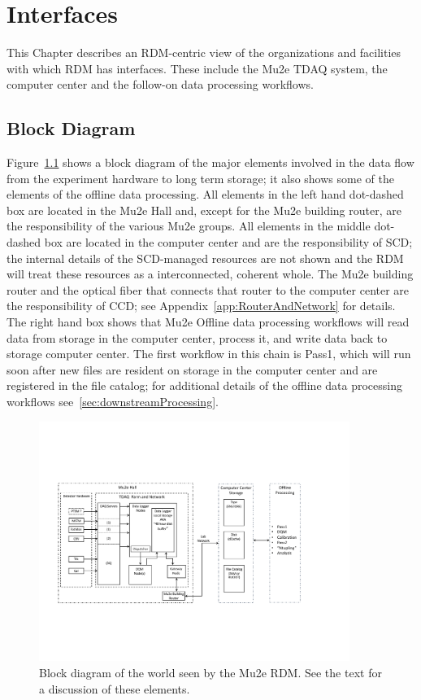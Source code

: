 \chapter{Interfaces}
\label{ch:SelectedDetails}
This Chapter describes an RDM-centric view of the organizations and facilities
with which RDM has interfaces.  These include the Mu2e TDAQ system,
the computer center and the follow-on data processing workflows.

\section{Block Diagram}
\label{sec:BlockDiagram}

Figure~\ref{fig:blockdiagram} shows a block diagram of the major elements involved
in the data flow from the experiment hardware to long term storage; it also shows
some of the elements of the offline data processing.
All elements in the left hand dot-dashed box are located in the Mu2e Hall
and, except for the Mu2e building router, are the responsibility of the various Mu2e groups.
All elements in the middle dot-dashed box are located in the computer center
and are the responsibility of SCD; the internal details of the SCD-managed resources
are not shown and the RDM will treat these resources as a interconnected, coherent whole.
The Mu2e building router and the optical fiber that connects that router
to the computer center are the responsibility of CCD;
see Appendix~\ref{app:RouterAndNetwork} for details.
The right hand box shows that Mu2e Offline data processing workflows
will read data from storage in the computer center,
process it,
and write data back to storage computer center.
The first workflow in this chain is Pass1, which will run soon after new files
are resident on storage in the computer center and are registered in the file catalog;
for additional details of the offline data processing workflows see~\ref{sec:downstreamProcessing}.

\begin{figure}[tbp]
\centering
\includegraphics[width=0.9\textwidth]{figures/interface_with_TDAQ.pdf}
\caption[Block diagram of interfaces seen by the Mu2e RDM]{
  Block diagram of the world seen by the Mu2e RDM.
  See the text for a discussion of these elements.}
\label{fig:blockdiagram}
\end{figure}


